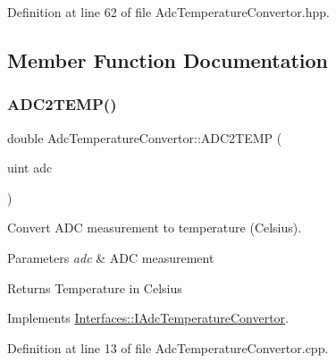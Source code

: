 Definition at line 62 of file Adc\+Temperature\+Convertor.\+hpp.



\subsection{Member Function Documentation}
\mbox{\label{class_adc_temperature_convertor_a3ee4549435400d9ed319fd5fdb83c97f}} 
\subsubsection{\texorpdfstring{A\+D\+C2\+T\+E\+M\+P()}{ADC2TEMP()}}
{\footnotesize\ttfamily double Adc\+Temperature\+Convertor\+::\+A\+D\+C2\+T\+E\+MP (\begin{DoxyParamCaption}\item[{uint}]{adc }\end{DoxyParamCaption})\hspace{0.3cm}{\ttfamily [virtual]}}



Convert A\+DC measurement to temperature (Celsius). 


\begin{DoxyParams}{Parameters}
{\em adc} & A\+DC measurement \\
\hline
\end{DoxyParams}
\begin{DoxyReturn}{Returns}
Temperature in Celsius 
\end{DoxyReturn}


Implements \hyperlink{class_interfaces_1_1_i_adc_temperature_convertor_aa6283c62cbbb012954b5e51d7a969385}{Interfaces\+::\+I\+Adc\+Temperature\+Convertor}.



Definition at line 13 of file Adc\+Temperature\+Convertor.\+cpp.

\mbox{\label{class_adc_temperature_convertor_aeab56811467e8019731f1e2867a76671}} 
